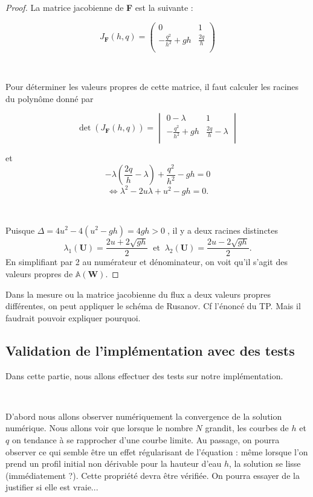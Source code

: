 \documentclass[
11pt, %
francais, %
singlespacing, %
headsepline, %
]{MastersDoctoralThesis} %
\begin{document}
\begin{proof}

La matrice jacobienne de \textbf{F} est la suivante :

$$J_{\textbf{F}}(h, q) =\begin{pmatrix}
   0 & 1  \\
   -\frac{q^{2}}{h^{2}}+gh & \frac{2q}{h}  \\
\end{pmatrix}$$

\

Pour déterminer les valeurs propres de cette matrice, il faut calculer les racines du polynôme donné par

$$\det (J_{\textbf{F}}(h, q)) =\begin{vmatrix}
   0-\lambda & 1  \\
   -\frac{q^{2}}{h^{2}}+gh & \frac{2q}{h}-\lambda  \\
\end{vmatrix}$$

et $$-\lambda(\frac{2q}{h}-\lambda)+\frac{q^{2}}{h^{2}}-gh=0$$
$$\Leftrightarrow \lambda^{2}-2u\lambda+u^{2}-gh=0.$$

\

Puisque $\Delta=4u^{2}-4(u^{2}-gh)=4gh>0\phantom{.}$, il y a deux racines distinctes 
$$\lambda_{1}(\textbf{U})=\frac{2u+2\sqrt{gh}}{2} \phantom{..}\text{et}\phantom{..} \lambda_{2}(\textbf{U})=\frac{2u-2\sqrt{gh}}{2}.$$
En simplifiant par 2 au numérateur et dénominateur, on voit qu'il s'agit des valeurs propres de  $\mathbb{A}(\textbf{W}).$

\end{proof}

Dans la mesure ou la matrice jacobienne du flux a deux valeurs propres différentes, on peut appliquer le schéma de Rusanov.
Cf l'énoncé du TP. Mais il faudrait pouvoir expliquer pourquoi.

\subsection{Validation de l'implémentation avec des tests}

Dans cette partie, nous allons effectuer des tests sur notre implémentation.

\

D’abord nous allons observer numériquement la convergence de la solution numérique. Nous allons voir que lorsque le nombre $N$ grandit, 
les courbes de $h$ et $q$ on tendance à se rapprocher d’une courbe limite. Au passage, on pourra observer ce qui semble être un effet régularisant de l'équation : même lorsque l'on prend un profil initial non dérivable pour la hauteur d'eau $h$, la solution se lisse (immédiatement ?). Cette propriété devra être vérifiée. On pourra essayer de la justifier si elle est vraie...
\end{document}
